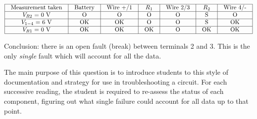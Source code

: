 






$$\vbox{\offinterlineskip
\halign{\strut
\vrule \quad\hfil # \ \hfil & 
\vrule \quad\hfil # \ \hfil & 
\vrule \quad\hfil # \ \hfil & 
\vrule \quad\hfil # \ \hfil & 
\vrule \quad\hfil # \ \hfil & 
\vrule \quad\hfil # \ \hfil & 
\vrule \quad\hfil # \ \hfil \vrule \cr
\noalign{\hrule}
%
Measurement taken & Battery & Wire +/1 & $R_1$ & Wire 2/3 & $R_2$ & Wire 4/- \cr
%
\noalign{\hrule}
%
$V_{R2}$ = 0 V & O & O & O & O & S & O \cr
%
\noalign{\hrule}
%
$V_{1-4}$ = 6 V & OK & OK & O & O & S & OK \cr
%
\noalign{\hrule}
%
$V_{R1}$ = 0 V & OK & OK & OK & O & OK & OK \cr
%
\noalign{\hrule}
} %
}$$ %

Conclusion: there is an open fault (break) between terminals 2 and 3.  This is the only {\it single} fault which will account for all the data.







The main purpose of this question is to introduce students to this style of documentation and strategy for use in troubleshooting a circuit.  For each successive reading, the student is required to re-assess the status of each component, figuring out what single failure could account for all data up to that point.




